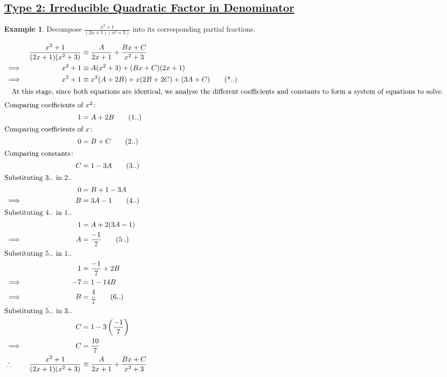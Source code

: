 \documentclass[12pt, a4paper]{report}
\theoremstyle{definition}
\newtheorem{example}{Example}
\begin{document}
	\subsection*{\underline{Type 2: Irreducible Quadratic Factor in Denominator}}
	\begin{example}
		Decompose $\frac{x^2 +1}{(2x+1)(x^2 +3)}$ into its corresponding partial fractions.
	\end{example}
	\begin{alignat*}{2}
		&            & \frac{x^2 +1}{(2x+1)(x^2 +3)} & \equiv \frac{A}{2x+1}+\frac{Bx+C}{x^2 +3}       \\
		& \implies   & x^2 + 1                       & \equiv A(x^ 2 + 3) + (Bx+C)(2x+1)               \\
		& \implies   & x^2 + 1                       & \equiv x^2(A+2B) + x(2B + 2C) + (3A+C)\tag{*..} \\
		\intertext{\quad At this stage, since both equations are identical, we analyse the different coefficients and constants to form a system of equations to solve.}
		\intertext{Comparing coefficients of $x^2\colon$}
		&            & 1                             & = A+2B\tag{1..}                                 \\
		\intertext{Comparing coefficients of $x\colon$}
		&            & 0                             & = B+C\tag{2..}                                  \\
		\intertext{Comparing constants$\colon$}
		&            & C                             & = 1-3A\tag{3..}                                 \\
		\intertext{Substituting  3.. in 2..}
		&            & 0                             & =B+1-3A                                         \\
		& \implies   & B                             & =3A-1\tag{4..}                                  \\
		\intertext{Substituting 4.. in 1..}
		&            & 1                             & = A + 2(3A-1)                                   \\
		& \implies   & A                             & = \frac{-1}{7} \tag{5..}                        \\
		\intertext{Substituting 5.. in 1..}
		&            & 1                             & = \frac{-1}{7} +2B                              \\
		& \implies   & -7                            & = 1-14B                                         \\
		& \implies   & B                             & =\frac{4}{7}\tag{6..}                           \\
		\intertext{Substituting 5.. in 3..}
		&            & C                             & = 1-3\left(\frac{-1}{7}\right)                  \\
		& \implies   & C                             & = \frac{10}{7}                                  \\
		& \therefore & \frac{x^2 +1}{(2x+1)(x^2 +3)} & \equiv \frac{A}{2x+1}+\frac{Bx+C}{x^2 +3}       
	\end{alignat*}
	\newpage
\end{document}
